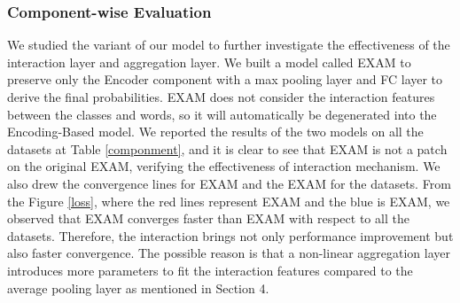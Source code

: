 \documentclass[letterpaper]{article} \usepackage{aaai19}  \usepackage{times}  \usepackage{helvet}  \usepackage{courier}  \usepackage{url}  \usepackage{graphicx}
\begin{document}
\subsubsection{Component-wise Evaluation}
We studied the variant of our model to further investigate the effectiveness of the interaction layer and aggregation layer. We built a model called EXAM to preserve only the Encoder component with a max pooling layer and FC layer to derive the final probabilities. EXAM does not consider the interaction features between the classes and words, so it will automatically be degenerated into the Encoding-Based model. We reported the results of the two models on all the datasets at Table \ref{componment}, and it is clear to see that EXAM is not a patch on the original EXAM, verifying the effectiveness of interaction mechanism.
We also drew the convergence lines for EXAM and the EXAM for the datasets. From the Figure \ref{loss}, where the red lines represent EXAM and the blue is EXAM, we observed that EXAM converges faster than EXAM with respect to all the datasets. Therefore, the interaction brings not only performance improvement but also faster convergence. The possible reason is that a non-linear aggregation layer introduces more parameters to fit the interaction features compared to the average pooling layer as mentioned in Section 4.
\end{document}
